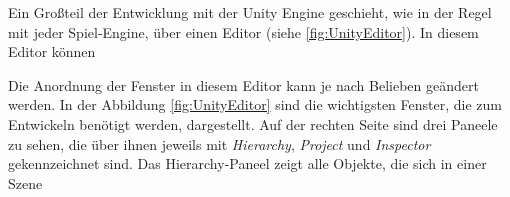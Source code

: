Ein Großteil der Entwicklung mit der Unity Engine geschieht, wie in der Regel mit jeder Spiel-Engine, über einen Editor (siehe \ref{fig:UnityEditor}). In diesem Editor können 


Die Anordnung der Fenster in diesem Editor kann je nach Belieben geändert werden. In der Abbildung \ref{fig:UnityEditor} sind die wichtigsten Fenster, die zum Entwickeln benötigt werden, dargestellt. Auf der rechten Seite sind drei Paneele zu sehen, die über ihnen jeweils mit \textit{Hierarchy}, \textit{Project} und \textit{Inspector} gekennzeichnet sind. Das Hierarchy-Paneel zeigt alle Objekte, die sich in einer Szene 

%
%
